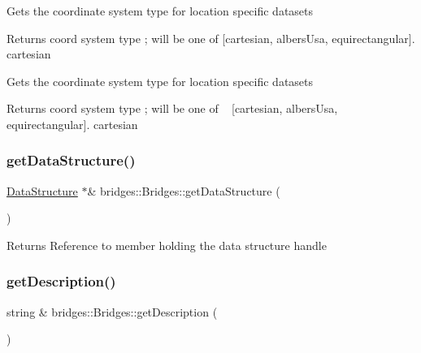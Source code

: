 Gets the coordinate system type for location specific datasets

\begin{DoxyReturn}{Returns}
coord system type ; will be one of \mbox{[}\textquotesingle{}cartesian\textquotesingle{}, \textquotesingle{}albers\+Usa\textquotesingle{}, \textquotesingle{}equirectangular\textquotesingle{}\mbox{]}. \textquotesingle{}cartesian\textquotesingle{}
\end{DoxyReturn}
Gets the coordinate system type for location specific datasets

\begin{DoxyReturn}{Returns}
coord system type ; will be one of ~\newline
\mbox{[}\textquotesingle{}cartesian\textquotesingle{}, \textquotesingle{}albers\+Usa\textquotesingle{}, \textquotesingle{}equirectangular\textquotesingle{}\mbox{]}. \textquotesingle{}cartesian\textquotesingle{} 
\end{DoxyReturn}
\mbox{\label{namespacebridges_1_1_bridges_a7cee9c57a0cd6a213722ba0a81a742f0}} 
\subsubsection{\texorpdfstring{get\+Data\+Structure()}{getDataStructure()}}
{\footnotesize\ttfamily \mbox{\hyperlink{classbridges_1_1_data_structure}{Data\+Structure}} $\ast$\& bridges\+::\+Bridges\+::get\+Data\+Structure (\begin{DoxyParamCaption}{ }\end{DoxyParamCaption})}

\begin{DoxyReturn}{Returns}
Reference to member holding the data structure handle 
\end{DoxyReturn}
\mbox{\label{namespacebridges_1_1_bridges_a11570abeb2d710440c709bafca816a64}} 
\subsubsection{\texorpdfstring{get\+Description()}{getDescription()}}
{\footnotesize\ttfamily string \& bridges\+::\+Bridges\+::get\+Description (\begin{DoxyParamCaption}{ }\end{DoxyParamCaption})}

